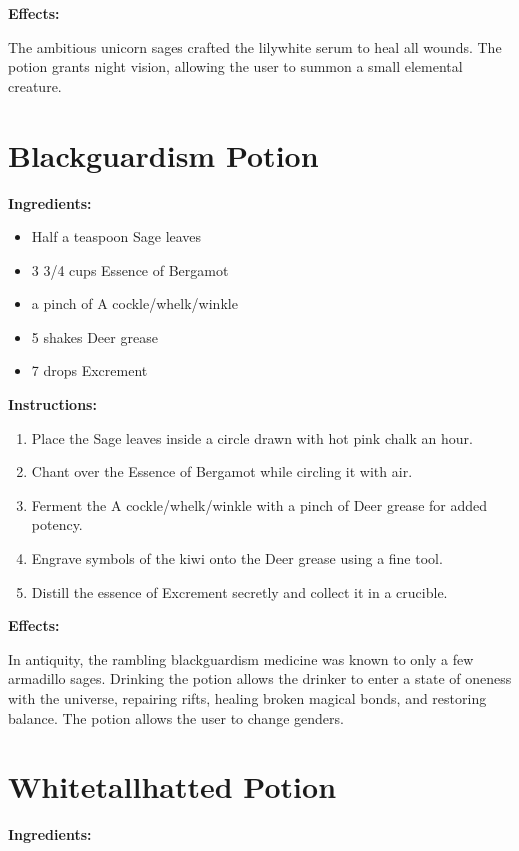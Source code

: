 \documentclass{article}
\begin{document}
\textbf{Effects:}

The ambitious unicorn sages crafted the lilywhite serum to heal all wounds. The potion grants night vision, allowing the user to summon a small elemental creature.

\newpage
\section*{Blackguardism Potion}

\textbf{Ingredients:}

\begin{itemize}
  \item Half a teaspoon Sage leaves
  \item 3 3/4 cups Essence of Bergamot
  \item a pinch of A cockle/whelk/winkle
  \item 5 shakes Deer grease
  \item 7 drops Excrement
\end{itemize}

\textbf{Instructions:}

\begin{enumerate}
  \item Place the Sage leaves inside a circle drawn with hot pink chalk an hour.
  \item Chant over the Essence of Bergamot while circling it with air.
  \item Ferment the A cockle/whelk/winkle with a pinch of Deer grease for added potency.
  \item Engrave symbols of the kiwi onto the Deer grease using a fine tool.
  \item Distill the essence of Excrement secretly and collect it in a crucible.
\end{enumerate}

\textbf{Effects:}

In antiquity, the rambling blackguardism medicine was known to only a few armadillo sages. Drinking the potion allows the drinker to enter a state of oneness with the universe, repairing rifts, healing broken magical bonds, and restoring balance. The potion allows the user to change genders.

\newpage
\section*{Whitetallhatted Potion}

\textbf{Ingredients:}
\end{document}
